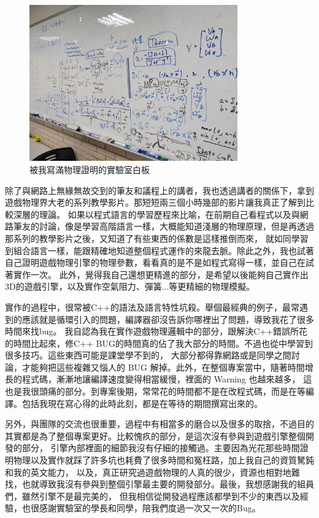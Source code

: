 \begin{figure}[h]
    \begin{center}
    \includegraphics[width=0.8\textwidth]{./resources/ch6/halloworld_1.jpg}
    \end{center}
\caption*{被我寫滿物理證明的實驗室白板}
\end{figure}

除了與網路上無緣無故交到的筆友和議程上的講者，我也透過講者的關係下，拿到遊戲物理界大老的系列教學影片。那短短兩三個小時幾部的影片讓我真正了解到比較深層的理論。
如果以程式語言的學習歷程來比喻，在前期自己看程式以及與網路筆友的討論，像是學習高階語言一樣，大概能知道淺層的物理原理，但是再透過那系列的教學影片之後，又知道了有些東西的係數是這樣推倒而來，
就如同學習到組合語言一樣，能跟精確地知道整個程式運作的來龍去脈。除此之外，我也試著自己證明遊戲物理引擎的物理參數，看看真的是不是如程式寫得一樣，並自己在試著實作一次。
此外，覺得我自己還想更精進的部分，是希望以後能夠自己實作出3D的遊戲引擎，以及實作空氣阻力、彈簧...等更精細的物理模擬。

實作的過程中，很常被C++的語法及語言特性坑殺。舉個最經典的例子，最常遇到的應該就是循環引入的問題，編譯器卻沒告訴你哪裡出了問題，導致我花了很多時間來找bug。
我自認為我在實作遊戲物理邏輯中的部分，跟解決C++錯誤所花的時間比起來，修C++ BUG的時間真的佔了我大部分的時間。不過也從中學習到很多技巧。這些東西可能是課堂學不到的，
大部分都得靠網路或是同學之間討論，才能夠把這些複雜又惱人的 BUG 解掉。此外，在整個專案當中，隨著時間增長的程式碼，漸漸地讓編譯速度變得相當緩慢，裡面的 Warning 也越來越多，
這也是我很頭痛的部分。到專案後期，常常花的時間都不是在改程式碼，而是在等編譯。包括我現在寫心得的此時此刻，都是在等待的期間撰寫出來的。

另外，與團隊的交流也很重要，過程中有相當多的磨合以及很多的取捨，不過目的其實都是為了整個專案更好。比較愧疚的部分，是這次沒有參與到遊戲引擎整個開發的部分，
引擎內部裡面的細節我沒有仔細的接觸過。主要因為光花那些時間證明物理以及實作就踩了許多坑也耗費了很多時間和冤枉路，加上我自己的資質駑鈍和我的英文能力，
以及，真正研究過遊戲物理的人真的很少，資源也相對地難找，也就導致我沒有參與到整個引擎最主要的開發部分。最後，我想感謝我的組員們，雖然引擎不是最完美的，
但我相信從開發過程應該都學到不少的東西以及經驗，也很感謝實驗室的學長和同學，陪我們度過一次又一次的Bug。

